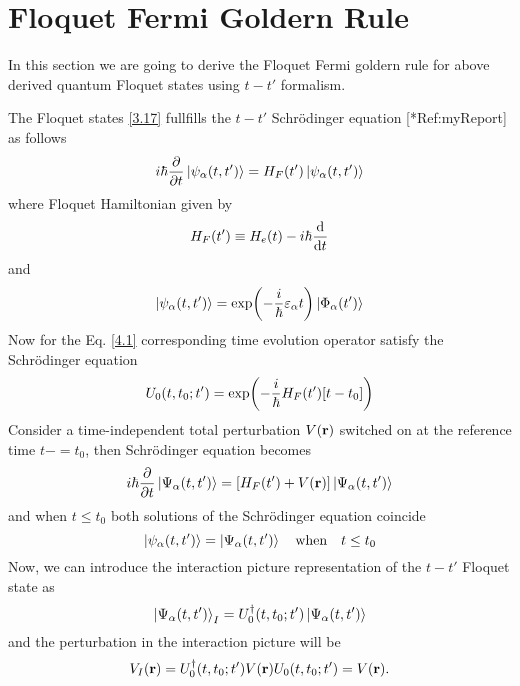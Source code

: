 \section{Floquet Fermi Goldern Rule}

In this section we are going to derive the Floquet Fermi goldern rule for above derived quantum Floquet states using $t-t'$ formalism.

\vspace{5mm}
\noindent
The Floquet states \eqref{3.17} fullfills the $t-t'$ Schrödinger equation [*Ref:myReport] as follows
\begin{equation} \label{4.1}
  i \hbar \pdv{t}\ket{\psi_{\alpha}(t,t')} =
  H_F(t') \ket{\psi_{\alpha}(t,t')}
\end{equation}
where Floquet Hamiltonian given by
\begin{equation} \label{4.2}
  H_F(t') \equiv
  H_e(t) - i\hbar \dv{t}
\end{equation}
and
\begin{equation} \label{4.3}
  \ket{\psi_{\alpha}(t,t')} =
  \exp(-\frac{i}{\hbar}\varepsilon_{\alpha} t)\ket{\Phi_{\alpha}(t')}
\end{equation}
Now for the Eq. \eqref{4.1} corresponding time evolution operator satisfy the Schrödinger equation
\begin{equation} \label{4.4}
  U_0(t,t_0;t') = \exp(-\frac{i}{\hbar}H_F(t')\qty[t-t_0])
\end{equation}
Consider a time-independent total perturbation $V(\mathbf{r})$ switched on at the reference time $t-=t_0$, then Schrödinger equation becomes
\begin{equation} \label{4.5}
  i \hbar \pdv{t}\ket{\Psi_{\alpha}(t,t')} =
  \qty[H_F(t') + V(\mathbf{r})]\ket{\Psi_{\alpha}(t,t')}
\end{equation}
and when $t\leq t_0$ both solutions of the Schrödinger equation coincide
\begin{equation} \label{4.6}
  \ket{\psi_{\alpha}(t,t')} =\ket{\Psi_{\alpha}(t,t')} \quad
  \text{when} \quad
  t \leq t_0
\end{equation}
Now, we can introduce the interaction picture representation of the $t-t'$ Floquet state as
\begin{equation} \label{4.7}
  \ket{\Psi_{\alpha}(t,t')}_I = U_0^{\dagger}(t,t_0;t')
  \ket{\Psi_{\alpha}(t,t')}
\end{equation}
and the perturbation in the interaction picture will be
\begin{equation} \label{4.8}
  V_I(\mathbf{r}) = U_0^{\dagger}(t,t_0;t')V(\mathbf{r})U_0(t,t_0;t') =
  V(\mathbf{r}).
\end{equation}
